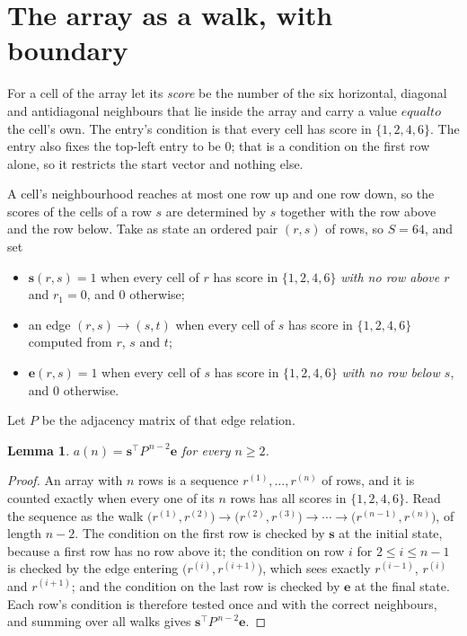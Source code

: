 \documentclass[11pt,a4paper]{article}
\theoremstyle{plain}
\newtheorem{lemma}[theorem]{Lemma}
\theoremstyle{definition}
\begin{document}
\section{The array as a walk, with boundary}

For a cell of the array let its \emph{score} be the number of the six horizontal, diagonal and antidiagonal neighbours that lie inside
the array and carry a value $equal to$ the cell's own. The entry's condition is that every cell
has score in $\{1,2,4,6\}$. The entry also fixes the top-left entry to be $0$; that is a condition on the first row alone, so it restricts the start vector and nothing else.

A cell's neighbourhood reaches at most one row up and one row down, so the scores of the
cells of a row $s$ are determined by $s$ together with the row above and the row below.
Take as state an ordered pair $(r,s)$ of rows, so $S=64$, and set
\begin{itemize}
\item $\mathbf{s}(r,s)=1$ when every cell of $r$ has score in $\{1,2,4,6\}$ \emph{with no row
above $r$} and $r_1=0$, and $0$ otherwise;
\item an edge $(r,s)\to(s,t)$ when every cell of $s$ has score in $\{1,2,4,6\}$ computed from
$r$, $s$ and $t$;
\item $\mathbf{e}(r,s)=1$ when every cell of $s$ has score in $\{1,2,4,6\}$ \emph{with no row
below $s$}, and $0$ otherwise.
\end{itemize}
Let $P$ be the adjacency matrix of that edge relation.

\begin{lemma}\label{lem:walk}
$a(n)=\mathbf{s}^{\!\top}P^{\,n-2}\mathbf{e}$ for every $n\ge2$.
\end{lemma}

\begin{proof}
An array with $n$ rows is a sequence $r^{(1)},\dots,r^{(n)}$ of rows, and it is counted
exactly when every one of its $n$ rows has all scores in $\{1,2,4,6\}$. Read the sequence as the
walk $\bigl(r^{(1)},r^{(2)}\bigr)\to\bigl(r^{(2)},r^{(3)}\bigr)\to\cdots\to
\bigl(r^{(n-1)},r^{(n)}\bigr)$, of length $n-2$. The condition on the first row is
checked by $\mathbf{s}$ at the initial state, because a first row has no row above it; the
condition on row $i$ for $2\le i\le n-1$ is checked by the edge entering
$\bigl(r^{(i)},r^{(i+1)}\bigr)$, which sees exactly $r^{(i-1)}$, $r^{(i)}$ and
$r^{(i+1)}$; and the condition on the last row is checked by $\mathbf{e}$ at the final
state. Each row's condition is therefore tested once and with the correct neighbours, and
summing over all walks gives $\mathbf{s}^{\!\top}P^{\,n-2}\mathbf{e}$.
\end{proof}
\end{document}
